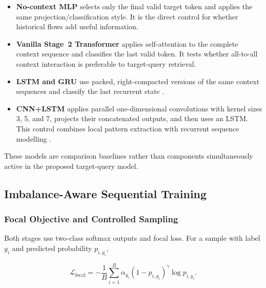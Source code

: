 \begin{itemize}[leftmargin=*]
    \item \textbf{No-context MLP} selects only the final valid target token and
    applies the same projection/classification style. It is the direct control
    for whether historical flows add useful information.

    \item \textbf{Vanilla Stage~2 Transformer} applies self-attention to the
    complete context sequence and classifies the last valid token. It tests
    whether all-to-all context interaction is preferable to target-query
    retrieval.

    \item \textbf{LSTM and GRU} use packed, right-compacted versions of the same
    context sequences and classify the last recurrent state
    \cite{Hochreiter1997LSTM,Cho2014GRU}.

    \item \textbf{CNN+LSTM} applies parallel one-dimensional convolutions with
    kernel sizes 3, 5, and 7, projects their concatenated outputs, and then uses
    an LSTM. This control combines local pattern extraction with recurrent
    sequence modelling \cite{Kim2014CNN,Hochreiter1997LSTM}.
\end{itemize}

These models are comparison baselines rather than components simultaneously
active in the proposed target-query model.

\subsection{Imbalance-Aware Sequential Training}
\label{subsec:method_training}

\subsubsection{Focal Objective and Controlled Sampling}
\label{subsubsec:focal_training}

Both stages use two-class softmax outputs and focal loss. For a sample with
label $y_i$ and predicted probability $p_{i,y_i}$,

\begin{equation}
    \mathcal{L}_{\mathrm{focal}}
    =-\frac{1}{B}
      \sum_{i=1}^{B}
      \alpha_{y_i}
      \left(1-p_{i,y_i}\right)^{\gamma}
      \log p_{i,y_i}.
    \label{eq:method_focal_loss}
\end{equation}

